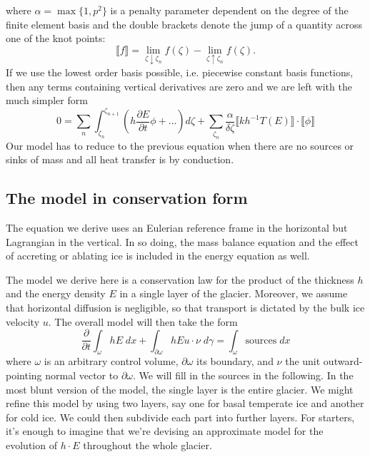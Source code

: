 \documentclass{article}
\theoremstyle{definition}
\theoremstyle{plain}
\begin{document}
where $\alpha = \max\{1, p^2\}$ is a penalty parameter dependent on the degree of the finite element basis and the double brackets denote the jump of a quantity across one of the knot points:
\begin{equation}
    \llbracket f\rrbracket = \lim_{\zeta\downarrow\zeta_n}f(\zeta) - \lim_{\zeta\uparrow\zeta_n}f(\zeta).
\end{equation}
If we use the lowest order basis possible, i.e. piecewise constant basis functions, then any terms containing vertical derivatives are zero and we are left with the much simpler form
\begin{equation}
    0 = \sum_n\int_{\zeta_n}^{\zeta_{n + 1}}\left(h\frac{\partial E}{\partial t}\phi + \ldots\right)d\zeta + \sum_{\zeta_n}\frac{\alpha}{\delta\zeta}\llbracket kh^{-1}T(E)\rrbracket\cdot\llbracket\phi\rrbracket
\end{equation}
Our model has to reduce to the previous equation when there are no sources or sinks of mass and all heat transfer is by conduction.


\subsection{The model in conservation form}

The equation we derive uses an Eulerian reference frame in the horizontal but Lagrangian in the vertical.
In so doing, the mass balance equation and the effect of accreting or ablating ice is included in the energy equation as well.

The model we derive here is a conservation law for the product of the thickness $h$ and the energy density $E$ in a single layer of the glacier.
Moreover, we assume that horizontal diffusion is negligible, so that transport is dictated by the bulk ice velocity $u$.
The overall model will then take the form
\begin{equation}
    \frac{\partial}{\partial t}\int_\omega hE\;dx + \int_{\partial\omega}hEu\cdot\nu\;d\gamma = \int_\omega\text{sources}\;dx
\end{equation}
where $\omega$ is an arbitrary control volume, $\partial\omega$ its boundary, and $\nu$ the unit outward-pointing normal vector to $\partial\omega$.
We will fill in the sources in the following.
In the most blunt version of the model, the single layer is the entire glacier.
We might refine this model by using two layers, say one for basal temperate ice and another for cold ice.
We could then subdivide each part into further layers.
For starters, it's enough to imagine that we're devising an approximate model for the evolution of $h\cdot E$ throughout the whole glacier.
\end{document}

